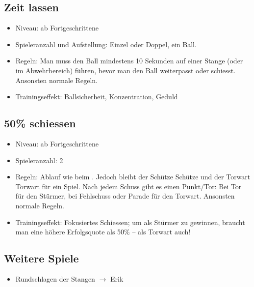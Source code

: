 \subsection{Zeit lassen}
\label{spielformen:sonderregeln:zeitlassen}

\begin{itemize}
\item Niveau: ab Fortgeschrittene
\item Spieleranzahl und Aufstellung: Einzel oder Doppel, ein Ball.
\item Regeln: 
Man muss den Ball mindestens 10 Sekunden auf einer Stange (oder im Abwehrbereich) führen, bevor man den Ball weiterpasst oder schiesst. 
Ansonsten normale Regeln.
\item Trainingseffekt: Ballsicherheit, Konzentration, Geduld 
\end{itemize}


\subsection{50\% schiessen}
\label{spielformen:sonderregeln:zeitlassen}

\begin{itemize}
\item Niveau: ab Fortgeschrittene
\item Spieleranzahl: 2
\item Regeln: 
Ablauf wie beim . Jedoch bleibt der Schütze Schütze und der Torwart Torwart für ein Spiel. Nach jedem Schuss gibt es einen Punkt/Tor: Bei Tor für den Stürmer, bei Fehlschuss oder Parade für den Torwart.  
Ansonsten normale Regeln.
\item Trainingseffekt: Fokusiertes Schiessen; um als Stürmer zu gewinnen, braucht man eine höhere Erfolgsquote als 50\% -- als Torwart auch! 
\end{itemize}


\subsection{Weitere Spiele}
\label{spielformen:sonderregeln:weiteres}

\begin{itemize}
\item Rundschlagen der Stangen $\rightarrow$ Erik
\end{itemize}

